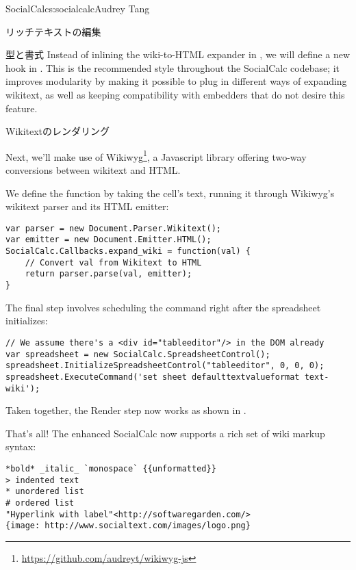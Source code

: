 \begin{aosachapter}{SocialCalc}{s:socialcalc}{Audrey Tang}
\begin{aosasect1}{リッチテキストの編集}
\begin{aosasect2}{型と書式}
Instead of inlining the wiki-to-HTML expander in
, we will define a new hook in
.  This is the recommended style
throughout the SocialCalc codebase; it improves modularity by making
it possible to plug in different ways of expanding wikitext, as well
as keeping compatibility with embedders that do not desire this
feature.

\end{aosasect2}

\begin{aosasect2}{Wikitextのレンダリング}

Next, we'll make use of
Wikiwyg\footnote{\url{https://github.com/audreyt/wikiwyg-js}}, a
Javascript library offering two-way conversions between wikitext and
HTML.

We define the  function by taking the cell's text,
running it through Wikiwyg's wikitext parser and its HTML emitter:

\begin{verbatim}
var parser = new Document.Parser.Wikitext();
var emitter = new Document.Emitter.HTML();
SocialCalc.Callbacks.expand_wiki = function(val) {
    // Convert val from Wikitext to HTML
    return parser.parse(val, emitter);
}
\end{verbatim}

\pagebreak 
\noindent The final step involves scheduling the  command right after the
spreadsheet initializes:


\begin{verbatim}
// We assume there's a <div id="tableeditor"/> in the DOM already
var spreadsheet = new SocialCalc.SpreadsheetControl();
spreadsheet.InitializeSpreadsheetControl("tableeditor", 0, 0, 0);
spreadsheet.ExecuteCommand('set sheet defaulttextvalueformat text-wiki');
\end{verbatim}

\noindent Taken together, the Render step now works as shown in
.


That's all!  The enhanced SocialCalc now supports a rich set of wiki
markup syntax:

\begin{verbatim}
*bold* _italic_ `monospace` {{unformatted}}
> indented text
* unordered list
# ordered list
"Hyperlink with label"<http://softwaregarden.com/>
{image: http://www.socialtext.com/images/logo.png}
\end{verbatim}


\end{aosasect2}
\end{aosasect1}
\end{aosachapter}
